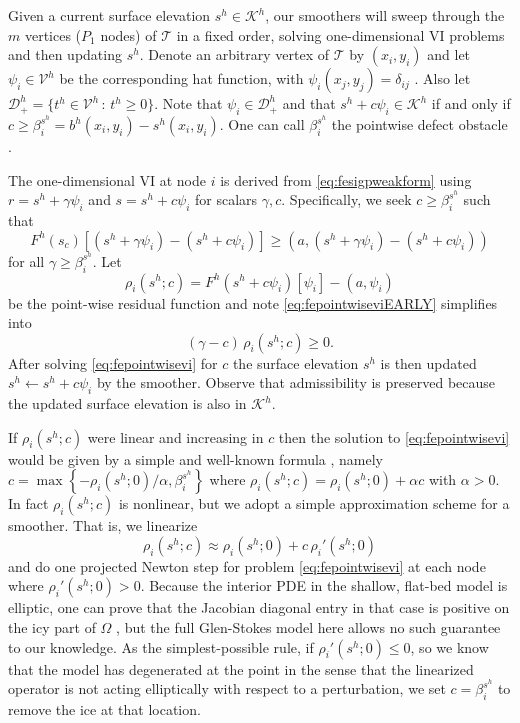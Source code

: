 \documentclass[letterpaper,final,12pt,reqno]{amsart}
\theoremstyle{claim}
\newcommand{\ip}[2]{\left(#1,#2\right)}
\numberwithin{equation}{section}
\numberwithin{figure}{section}
\numberwithin{table}{section}
\numberwithin{theorem}{section}
\begin{document}
Given a current surface elevation $s^h\in \mathcal{K}^h$, our smoothers will sweep through the $m$ vertices ($P_1$ nodes) of $\mathcal{T}$ in a fixed order, solving one-dimensional VI problems and then updating $s^h$.   Denote an arbitrary vertex of $\mathcal{T}$ by $(x_i,y_i)$ and let $\psi_i \in \mathcal{V}^h$ be the corresponding hat function, with $\psi_i(x_j,y_j)=\delta_{ij}$ \cite{Elmanetal2014}.  Also let $\mathcal{D}_+^h = \{t^h \in \mathcal{V}^h \,:\, t^h \ge 0\}$.  Note that $\psi_i \in \mathcal{D}_+^h$ and that $s^h + c \psi_i \in \mathcal{K}^h$ if and only if $c\ge \beta_i^{s^h} = b^h(x_i,y_i) - s^h(x_i,y_i)$.  One can call $\beta_i^{s^h}$ the pointwise defect obstacle \cite{GraeserKornhuber2009}.

The one-dimensional VI at node $i$ is derived from \eqref{eq:fesigpweakform} using $r = s^h+\gamma \psi_i$ and $s = s^h+c \psi_i$ for scalars $\gamma,c$.  Specifically, we seek $c \ge \beta_i^{s^h}$ such that
\begin{equation}
F^h(s_c)[(s^h+\gamma \psi_i) - (s^h+c \psi_i)] \ge \ip{a}{(s^h+\gamma \psi_i) - (s^h+c \psi_i)} \label{eq:fepointwiseviEARLY}
\end{equation}
for all $\gamma \ge \beta_i^{s^h}$.  Let
\begin{equation}
\rho_i(s^h; c) = F^h(s^h+c\psi_i)[\psi_i] - \ip{a}{\psi_i} \label{eq:ferhoi}
\end{equation}
be the point-wise residual function and note \eqref{eq:fepointwiseviEARLY} simplifies into
\begin{equation}
(\gamma - c) \,\rho_i(s^h; c) \ge 0. \label{eq:fepointwisevi}
\end{equation}
After solving \eqref{eq:fepointwisevi} for $c$ the surface elevation $s^h$ is then updated $s^h \gets s^h + c \psi_i$ by the smoother.  Observe that admissibility is preserved because the updated surface elevation is also in $\mathcal{K}^h$.

If $\rho_i(s^h; c)$ were linear and increasing in $c$ then the solution to \eqref{eq:fepointwisevi} would be given by a simple and well-known formula \cite[formula (4.4), for example]{GraeserKornhuber2009}, namely $c = \max\left\{-\rho_i(s^h; 0)/\alpha, \beta_i^{s^h}\right\}$ where $\rho_i(s^h; c) = \rho_i(s^h; 0) + \alpha c$ with $\alpha > 0$.  In fact $\rho_i(s^h; c)$ is nonlinear, but we adopt a simple approximation scheme for a smoother.  That is, we linearize
\begin{equation}
\rho_i(s^h; c) \approx \rho_i(s^h; 0) + c\, \rho_i'(s^h; 0) \label{eq:rhoapprox}
\end{equation}
and do one projected Newton step for problem \eqref{eq:fepointwisevi} at each node where $\rho_i'(s^h; 0) > 0$.  Because the interior PDE in the shallow, flat-bed model is elliptic, one can prove that the Jacobian diagonal entry in that case is positive on the icy part of $\Omega$ \cite{JouvetBueler2012}, but the full Glen-Stokes model here allows no such guarantee to our knowledge.  As the simplest-possible rule, if $\rho_i'(s^h; 0) \le 0$, so we know that the model has degenerated at the point in the sense that the linearized operator is not acting elliptically with respect to a perturbation, we set $c = \beta_i^{s^h}$ to remove the ice at that location.  %
\end{document}
